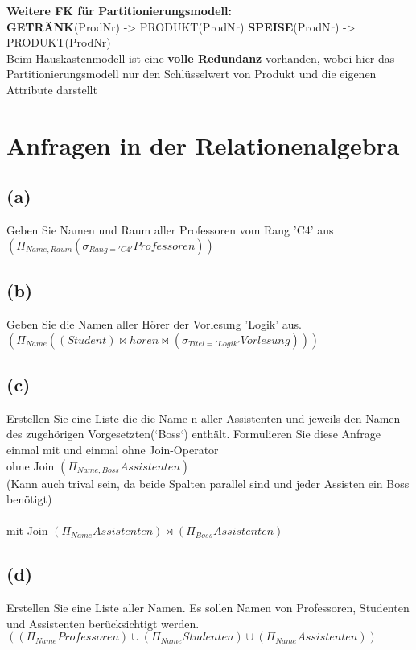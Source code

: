 \documentclass{article}
\begin{document}
\textbf{Weitere FK für Partitionierungsmodell:}\\
\textbf{GETRÄNK}(ProdNr) -> PRODUKT(ProdNr)
\textbf{SPEISE}(ProdNr) -> PRODUKT(ProdNr)\\

Beim Hauskastenmodell ist eine \textbf{volle Redundanz} vorhanden, wobei hier das Partitionierungsmodell
nur den Schlüsselwert von Produkt und die eigenen Attribute darstellt

\section{Anfragen in der Relationenalgebra}
\subsection{(a)}
Geben Sie Namen und Raum aller Professoren vom Rang 'C4' aus\\
$(\Pi_{Name,Raum}(\sigma_{Rang='C4'} Professoren))$ \\

\subsection{(b)}
Geben Sie die Namen aller Hörer der Vorlesung 'Logik' aus. \\
$(\Pi_{Name}((Student) \bowtie horen \bowtie (\sigma_{Titel='Logik'}Vorlesung)))$ \\

\subsection{(c)}
Erstellen Sie eine Liste die die Name n aller Assistenten und jeweils den
Namen des zugehörigen Vorgesetzten(‘Boss‘) enthält. Formulieren Sie diese Anfrage einmal mit und einmal 
ohne Join-Operator\\
ohne Join $(\Pi_{Name, Boss} Assistenten)$\\
(Kann auch trival sein, da beide Spalten parallel sind und jeder Assisten ein Boss benötigt)\\ \\

mit Join $(\Pi_{Name} Assistenten) \bowtie (\Pi_{Boss} Assistenten)$


\subsection{(d)}
Erstellen Sie eine Liste aller Namen. Es sollen Namen von Professoren,
Studenten und Assistenten berücksichtigt werden. \\
$((\Pi_{Name} Professoren) \cup (\Pi_{Name} Studenten) \cup (\Pi_{Name} Assistenten))$
\end{document}
